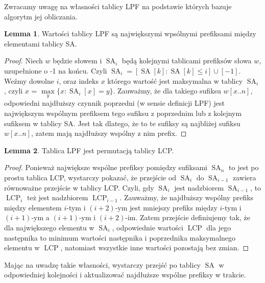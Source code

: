 \documentclass[a4paper,12pt]{article}
\theoremstyle{definition}
\newtheorem{lemma}{Lemma}[section]
\DeclareMathOperator{\SA}{SA}
\DeclareMathOperator{\LCP}{LCP}
\begin{document}
Zwracamy uwagę na własności tablicy LPF na podstawie których bazuje algorytm jej obliczania.

\begin{lemma}

Wartości tablicy LPF są największymi wpsólnymi prefiksami między elementami tablicy SA.

\begin{proof}

Niech $w$ będzie słowem i $\SA_{i}$ będą kolejnymi tablicami prefiksów słowa $w$, uzupełnione o -1 na końcu.
Czyli $\SA_{i} = [ \SA[k] : \SA[k] \leq i ] \cup [-1]$.
Weźmy dowolne $i$, oraz indeks $x$ którego wartość jest maksymalna w tablicy $\SA_{i}$,
 czyli $x$ = $\max\limits_{y} \{ x : \SA_{i}[x] = y \}$.
Zauważmy, że dla takiego sufiksu $w[x .. n]$, odpowiedni najdłuższy czynnik poprzedni (w sensie definicji LPF)
 jest największym wspólnym prefiksem tego sufiksu z poprzednim lub z kolejnym sufiksem w tablicy SA.
Jest tak dlatego, że to te sufiksy są najbliżej sufiksu $w[x .. n]$, zatem mają najdłuższy wspólny z nim prefix.

\end{proof}
\end{lemma}

\begin{lemma}

Tablica LPF jest permutacją tablicy LCP.

\begin{proof}

Ponieważ największe wspólne prefiksy pomiędzy sufiksami $\SA_{n}$ to jest po prostu tablica LCP,
 wystarczy pokazać, że przejście od $\SA_{i}$ do $\SA_{i - 1}$ zawiera równoważne przejście w tablicy LCP.
Czyli, gdy $\SA_{i}$ jest nadzbiorem $\SA_{i - 1}$, to $\LCP_{i}$ też jest nadzbiorem $\LCP_{i - 1}$.
Zauważmy, że najdłuższy wspólny prefiks między elementem $i$-tym i $(i + 2)$-ym jest mniejszy prefiks między $i$-tym i $(i + 1)$-ym a $(i + 1)$-ym i $(i + 2)$-im.
Zatem przejście definiujemy tak, że dla największego elementu w $\SA_{i}$, odpowiednie wartości $\LCP$ dla jego następnika
 to minimum wartości następnika i poprzednika maksymalnego elementu w $\LCP$, natomiast wszystkie inne wartości pozostają bez zmian.

\end{proof}
\end{lemma}

Mając na uwadzę takie własności, wystarczy przejść po tablicy $\SA$ w odpowiedniej kolejności 
 i aktualizować najdłuższe wspólne prefiksy w trakcie.
\end{document}
